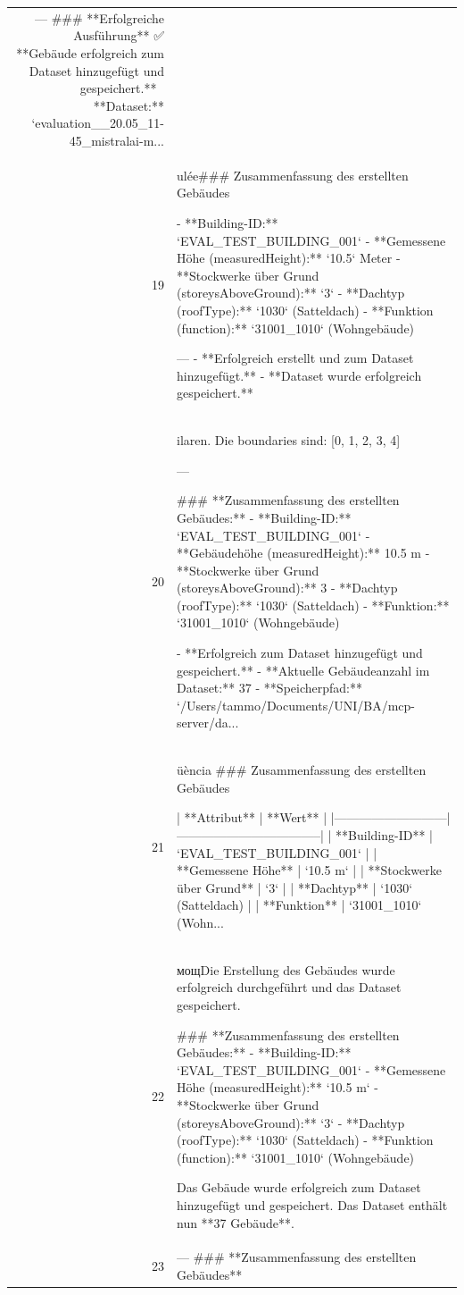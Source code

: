 \documentclass[a4paper,11pt]{article}
\begin{document}
\begin{table}[ht]
\begin{tabular}{r p{12cm}}
---
\#\#\# **Erfolgreiche Ausführung**
✅ **Gebäude erfolgreich zum Dataset hinzugefügt und gespeichert.**
📁 **Dataset:** `evaluation\_\_20.05\_11-45\_mistralai-m... \\
19 & ulée\#\#\# Zusammenfassung des erstellten Gebäudes

- **Building-ID:** `EVAL\_TEST\_BUILDING\_001`
- **Gemessene Höhe (measuredHeight):** `10.5` Meter
- **Stockwerke über Grund (storeysAboveGround):** `3`
- **Dachtyp (roofType):** `1030` (Satteldach)
- **Funktion (function):** `31001\_1010` (Wohngebäude)

---
- **Erfolgreich erstellt und zum Dataset hinzugefügt.**
- **Dataset wurde erfolgreich gespeichert.** \\
20 & ilaren. Die boundaries sind: [0, 1, 2, 3, 4]

---

\#\#\# **Zusammenfassung des erstellten Gebäudes:**
- **Building-ID:** `EVAL\_TEST\_BUILDING\_001`
- **Gebäudehöhe (measuredHeight):** 10.5 m
- **Stockwerke über Grund (storeysAboveGround):** 3
- **Dachtyp (roofType):** `1030` (Satteldach)
- **Funktion:** `31001\_1010` (Wohngebäude)

- **Erfolgreich zum Dataset hinzugefügt und gespeichert.**
  - **Aktuelle Gebäudeanzahl im Dataset:** 37
  - **Speicherpfad:** `/Users/tammo/Documents/UNI/BA/mcp-server/da... \\
21 & üència
\#\#\# Zusammenfassung des erstellten Gebäudes

| **Attribut**               | **Wert**                          |
|---------------------------|-----------------------------------|
| **Building-ID**            | `EVAL\_TEST\_BUILDING\_001`          |
| **Gemessene Höhe**         | `10.5 m`                          |
| **Stockwerke über Grund**   | `3`                               |
| **Dachtyp**               | `1030` (Satteldach)              |
| **Funktion**              | `31001\_1010` (Wohn... \\
22 &  мощDie Erstellung des Gebäudes wurde erfolgreich durchgeführt und das Dataset gespeichert.

\#\#\# **Zusammenfassung des erstellten Gebäudes:**
- **Building-ID:** `EVAL\_TEST\_BUILDING\_001`
- **Gemessene Höhe (measuredHeight):** `10.5 m`
- **Stockwerke über Grund (storeysAboveGround):** `3`
- **Dachtyp (roofType):** `1030` (Satteldach)
- **Funktion (function):** `31001\_1010` (Wohngebäude)

Das Gebäude wurde erfolgreich zum Dataset hinzugefügt und gespeichert. Das Dataset enthält nun **37 Gebäude**. \\
23 & ---
\#\#\# **Zusammenfassung des erstellten Gebäudes**


\end{tabular}
\end{table}
\end{document}
